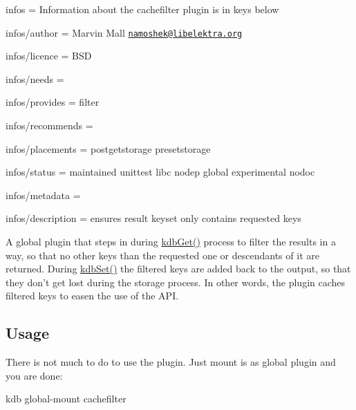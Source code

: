 
\begin{DoxyItemize}
\item infos = Information about the cachefilter plugin is in keys below
\item infos/author = Marvin Mall \href{mailto:namoshek@libelektra.org}{\tt namoshek@libelektra.\+org}
\item infos/licence = B\+S\+D
\item infos/needs =
\item infos/provides = filter
\item infos/recommends =
\item infos/placements = postgetstorage presetstorage
\item infos/status = maintained unittest libc nodep global experimental nodoc
\item infos/metadata =
\item infos/description = ensures result keyset only contains requested keys
\end{DoxyItemize}

A global plugin that steps in during {\ttfamily \hyperlink{group__kdb_ga28e385fd9cb7ccfe0b2f1ed2f62453a1}{kdb\+Get()}} process to filter the results in a way, so that no other keys than the requested one or descendants of it are returned. During {\ttfamily \hyperlink{group__kdb_ga11436b058408f83d303ca5e996832bcf}{kdb\+Set()}} the filtered keys are added back to the output, so that they don't get lost during the storage process. In other words, the plugin caches filtered keys to easen the use of the A\+P\+I.

\subsection*{Usage}

There is not much to do to use the plugin. Just mount is as global plugin and you are done\+: \begin{DoxyVerb}kdb global-mount cachefilter\end{DoxyVerb}
 